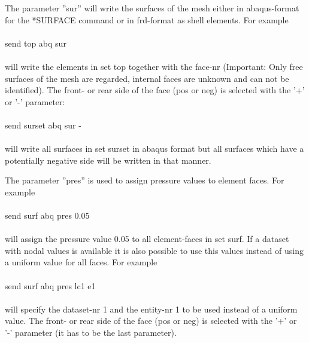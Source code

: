\documentclass{article}
\begin{document}
The parameter ''sur'' will write the surfaces of the mesh either in abaqus-format for the *SURFACE command or in frd-format as shell elements. For example\\\\send top abq sur\\\\will write the elements in set top together with the face-nr (Important: Only free surfaces of the mesh are regarded, internal faces are unknown and can not be identified). The front- or rear side of the face (pos or neg) is selected with the '+' or '-' parameter:\\\\send surset abq sur -\\\\will write all surfaces in set surset in abaqus format but all surfaces which have a potentially negative side will be written in that manner. 

The parameter ''pres'' is used to assign pressure values to element faces. For example\\\\send surf abq pres 0.05\\\\will assign the pressure value 0.05 to all element-faces in set surf. If a dataset with nodal values is available it is also possible to use this values instead of using a uniform value for all faces. For example\\\\send surf abq pres lc1 e1\\\\will specify the dataset-nr 1 and the entity-nr 1 to be used instead of a uniform value. The front- or rear side of the face (pos or neg) is selected with the '+' or '-' parameter (it has to be the last parameter).
\end{document}
